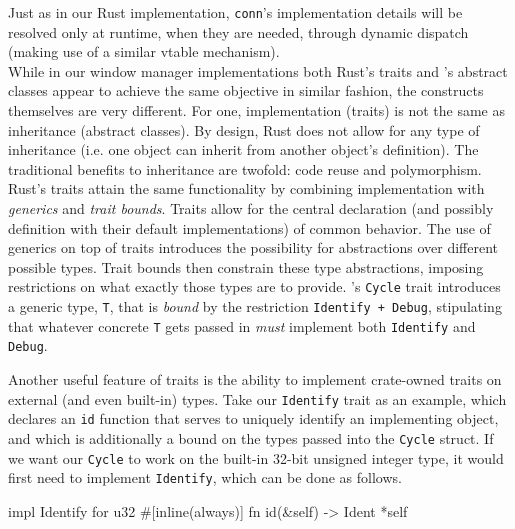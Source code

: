 Just  as in  our  Rust  implementation, \texttt{conn}'s  implementation
details will be resolved only at  runtime, when they are needed, through dynamic
dispatch (making use of a similar vtable mechanism).\\


While  in our  window  manager  implementations both  Rust's  traits and  \cpp's
abstract classes  appear to achieve the  same objective in similar  fashion, the
constructs themselves  are very different.  For one, implementation  (traits) is
not the same  as inheritance (abstract classes). By design,  Rust does not allow
for any type  of inheritance (i.e. one object can  inherit from another object's
definition). The  traditional benefits  to inheritance  are twofold:  code reuse
and  polymorphism. Rust's  traits  attain the  same  functionality by  combining
implementation with  \textit{generics} and  \textit{trait bounds}.  Traits allow
for  the  central  declaration  (and  possibly  definition  with  their  default
implementations)  of common  behavior.  The use  of generics  on  top of  traits
introduces the possibility for abstractions over different possible types. Trait
bounds then  constrain these  type abstractions,  imposing restrictions  on what
exactly  those  types are  to  provide.  \wmrs's \texttt{Cycle}  trait
introduces a generic  type, \texttt{T}, that is  \textit{bound} by the
restriction  \texttt{Identify  +  Debug},  stipulating  that  whatever
concrete  \texttt{T}  gets  passed  in  \textit{must}  implement  both
\texttt{Identify} and \texttt{Debug}.

Another useful feature of traits is  the ability to implement crate-owned traits
on  external (and  even  built-in) types.  Take our  \texttt{Identify}
trait  as an  example,  which declares  an  \texttt{id} function  that
serves to uniquely identify an implementing  object, and which is additionally a
bound on the  types passed into the \texttt{Cycle} struct.  If we want
our \texttt{Cycle}  to work  on the  built-in 32-bit  unsigned integer
type, it would first need to implement \texttt{Identify}, which can be
done as follows.

\begin{rustblock}
  impl Identify for u32 {
    #[inline(always)]
    fn id(&self) -> Ident {
      *self
    }
  }
\end{rustblock}

